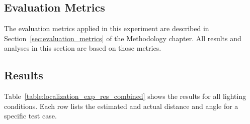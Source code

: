 \subsection{Evaluation Metrics}
The evaluation metrics applied in this experiment are described in Section~\ref{sec:evaluation_metrics} of the Methodology chapter. All results and analyses in this section are based on those metrics.

\subsection{Results}

Table~\ref{table:localization_exp_res_combined} shows the results for all lighting conditions. Each row lists the estimated and actual distance and angle for a specific test case.


